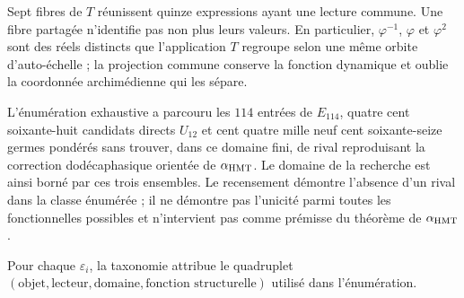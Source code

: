 Sept fibres de \(T\) réunissent quinze expressions ayant une lecture commune. Une
fibre partagée n’identifie pas non plus leurs valeurs. En particulier,
\(\varphi^{-1}\), \(\varphi\) et \(\varphi^2\) sont des réels distincts que
l’application \(T\) regroupe selon une même orbite d’auto-échelle ; la projection
commune conserve la fonction dynamique et oublie la coordonnée archimédienne qui les
sépare.

L’énumération exhaustive a parcouru les \(114\) entrées de \(E_{114}\),
quatre cent soixante-huit candidats directs \(U_{12}\) et cent quatre
mille neuf cent soixante-seize germes pondérés sans trouver, dans
ce domaine fini, de rival reproduisant la correction dodécaphasique
orientée de \(\alpha_{\rm HMT}\). Le domaine de la recherche est ainsi
borné par ces trois ensembles. Le recensement démontre l’absence d’un
rival dans la classe énumérée ; il ne démontre pas l’unicité parmi toutes les
fonctionnelles possibles et n’intervient pas comme prémisse du théorème de
\(\alpha_{\rm HMT}\).

Pour chaque \(\varepsilon_i\), la taxonomie attribue le quadruplet
\((\text{objet},\text{lecteur},\text{domaine},\text{fonction structurelle})\)
utilisé dans l’énumération.
